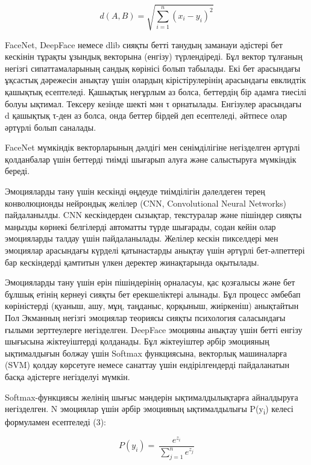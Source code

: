\begin{multicols}{2}
\begin{equation}
d(A,B) = \sqrt{\sum_{i = 1}^{n}\left( x_{i} - y_{i} \right)^{2}}
\end{equation}

FaceNet, DeepFace немесе dlib сияқты бетті танудың заманауи әдістері бет
кескінін тұрақты ұзындық векторына (енгізу) түрлендіреді. Бұл вектор
тұлғаның негізгі сипаттамаларының сандық көрінісі болып табылады. Екі
бет арасындағы ұқсастық дәрежесін анықтау үшін олардың кірістірулерінің
арасындағы евклидтік қашықтық есептеледі. Қашықтық неғұрлым аз болса,
беттердің бір адамға тиесілі болуы ықтимал. Тексеру кезінде шекті мән τ
орнатылады. Енгізулер арасындағы d қашықтық τ-ден аз болса, онда беттер
бірдей деп есептеледі, әйтпесе олар әртүрлі болып саналады.

FaceNet мүмкіндік векторларының дәлдігі мен сенімділігіне негізделген
әртүрлі қолданбалар үшін беттерді тиімді шығарып алуға және салыстыруға
мүмкіндік береді.

Эмоцияларды тану үшін кескінді өңдеуде тиімділігін дәлелдеген терең
конволюционды нейрондық желілер (CNN, Convolutional Neural Networks)
пайдаланылды. CNN кескіндерден сызықтар, текстуралар және пішіндер
сияқты маңызды көрнекі белгілерді автоматты түрде шығарады, содан кейін
олар эмоцияларды талдау үшін пайдаланылады. Желілер кескін пикселдері
мен эмоциялар арасындағы күрделі қатынастарды анықтау үшін әртүрлі
бет-әлпеттері бар кескіндерді қамтитын үлкен деректер жинақтарында
оқытылады.

Эмоцияларды тану үшін ерін пішіндерінің орналасуы, қас қозғалысы және
бет бұлшық етінің кернеуі сияқты бет ерекшеліктері алынады. Бұл процесс
әмбебап көріністерді (қуаныш, ашу, мұң, таңданыс, қорқыныш, жиіркеніш)
анықтайтын Пол Экманның негізгі эмоциялар теориясы сияқты психология
саласындағы ғылыми зерттеулерге негізделген. DeepFace эмоцияны анықтау
үшін бетті енгізу шығысына жіктеуіштерді қолданады. Бұл жіктеуіштер
әрбір эмоцияның ықтималдығын болжау үшін Softmax функциясына, векторлық
машиналарға (SVM) қолдау көрсетуге немесе санаттау үшін ендірілгендерді
пайдаланатын басқа әдістерге негізделуі мүмкін.

Softmax-функциясы желінің шығыс мәндерін ықтималдылықтарға айналдыруға
негізделген. N эмоциялар үшін әрбір эмоцияның ықтималдылығы
P(y\textsubscript{i}) келесі формуламен есептеледі (3):

\begin{equation}
P\left( y_{i} \right) = \ \frac{e^{z_{i}}}{\sum_{j = 1}^{n}e^{z_{j}}}
\end{equation}


\end{multicols}
